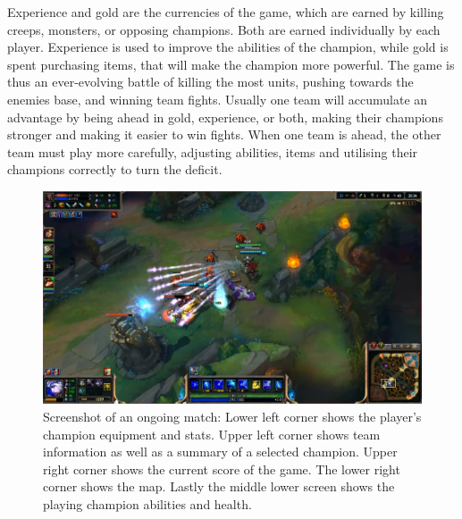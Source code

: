 Experience and gold are the currencies of the game, which are earned by killing creeps, monsters, or opposing champions. Both are earned individually by each player. Experience is used to improve the abilities of the champion, while gold is spent purchasing items, that will make the champion more powerful. The game is thus an ever-evolving battle of killing the most units, pushing towards the enemies base, and winning team fights. Usually one team will accumulate an advantage by being ahead in gold, experience, or both, making their champions stronger and making it easier to win fights. When one team is ahead, the other team must play more carefully, adjusting abilities, items and utilising their champions correctly to turn the deficit.

\begin{figure}[!htb]
  \centering
    \includegraphics[width=1\textwidth]{img/lolgame.png}
  \caption{Screenshot of an ongoing match: Lower left corner shows the player's champion equipment and stats. Upper left corner shows team information as well as a summary of a selected champion. Upper right corner shows the current score of the game. The lower right corner shows the map. Lastly the middle lower screen shows the playing champion abilities and health.}\label{fig:lolgame}
\end{figure}



